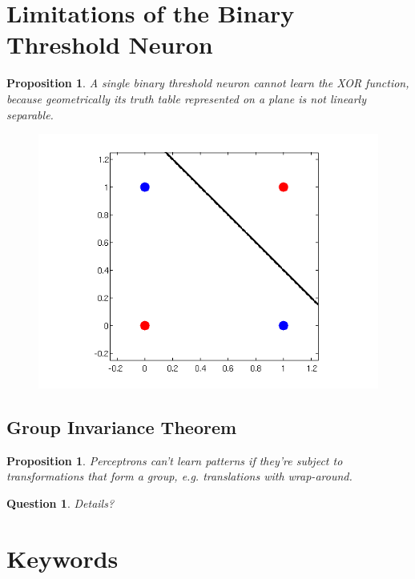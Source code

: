 \documentclass[12pt]{article}
\theoremstyle{plain}
\newtheorem{proposition}[theorem]{Proposition}
\newtheorem{question}[theorem]{Question}
\theoremstyle{definition}
\theoremstyle{remark}
\begin{document}
\section{Limitations of the Binary Threshold Neuron}

\begin{proposition}
A single binary threshold neuron cannot learn the XOR function, because geometrically its truth table represented on a plane is not linearly separable.
\end{proposition}

\begin{figure}[H]
\centering
\includegraphics[width=1.0\textwidth]{linSepXor}
\end{figure}

\subsection{Group Invariance Theorem}

\begin{proposition}
Perceptrons can't learn patterns if they're subject to transformations that form a group, e.g. translations with wrap-around.
\end{proposition}

\begin{question}
Details?
\end{question}

\section*{Keywords}
\end{document}
